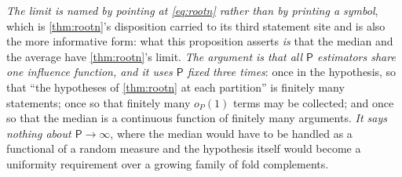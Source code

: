 \begin{proposition}
\[\]
\emph{The limit is named by pointing at \eqref{eq:rootn} rather than by printing a symbol}, which is
\cref{thm:rootn}'s disposition carried to its third statement site and is also the more informative
form: what this proposition asserts \emph{is} that the median and the average have
\cref{thm:rootn}'s limit.
\emph{The argument is that all $\mathsf P$ estimators share one influence function, and it uses
$\mathsf P$ fixed three times}: once in the hypothesis, so that ``the hypotheses of \cref{thm:rootn} at each
partition'' is finitely many statements; once so that finitely many $o_P(1)$ terms may be collected; and once
so that the median is a continuous function of finitely many arguments. \emph{It says nothing about
$\mathsf P\to\infty$}, where the median would have to be handled as a functional of a random measure and the
hypothesis itself would become a uniformity requirement over a growing family of fold complements.
\end{proposition}


